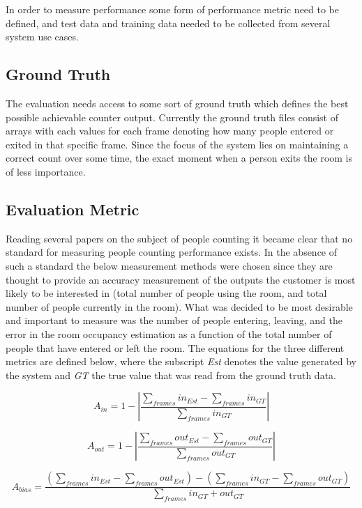 In order to measure performance some form of performance metric need to be defined, and test data and training data needed to be collected from several system use cases.

\subsection{Ground Truth}
The evaluation needs access to some sort of ground truth which defines the best possible achievable counter output. Currently the ground truth files consist of arrays with each values for each frame denoting how many people entered or exited in that specific frame. Since the focus of the system lies on maintaining a correct count over some time, the exact moment when a person exits the room is of less importance.

\subsection{Evaluation Metric}
Reading several papers on the subject of people counting it became clear that no standard for measuring people counting performance exists. In the absence of such a standard the below measurement methods were chosen since they are thought to provide an accuracy measurement of the outputs the customer is most likely to be interested in (total number of people using the room, and total number of people currently in the room).
What was decided to be most desirable and important to measure was the number of people entering, leaving, and the error in the room occupancy estimation as a function of the total number of people that have entered or left the room. The equations for the three different metrics are defined below, where the subscript \textit{Est} denotes the value generated by the system and \textit{GT} the true value that was read from the ground truth data.

\begin{equation}
\label{eq:in_accuracy}
A_{in} = 1 - |\frac{\sum_{frames}{in_{Est}}-\sum_{frames}{in_{GT}}}{\sum_{frames}in_{GT}}|
\end{equation} 

\begin{equation}
\label{eq:out_accuracy}
A_{out} = 1 - |\frac{\sum_{frames}{out_{Est}}-\sum_{frames}out_{GT}}{\sum_{frames}out_{GT}}| 
\end{equation} 

\begin{equation}
\label{eq:occupancy_bias}
A_{bias} = \frac{(\sum_{frames}{in_{Est}-\sum_{frames}out_{Est}})-(\sum_{frames}{in_{GT}-\sum_{frames}out_{GT}})}{\sum_{frames}in_{GT}+out_{GT}} 
\end{equation} 




